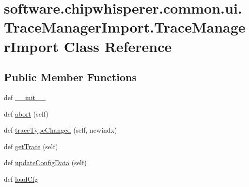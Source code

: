 \hypertarget{classsoftware_1_1chipwhisperer_1_1common_1_1ui_1_1TraceManagerImport_1_1TraceManagerImport}{}\section{software.\+chipwhisperer.\+common.\+ui.\+Trace\+Manager\+Import.\+Trace\+Manager\+Import Class Reference}
\label{classsoftware_1_1chipwhisperer_1_1common_1_1ui_1_1TraceManagerImport_1_1TraceManagerImport}
\subsection*{Public Member Functions}
\begin{DoxyCompactItemize}
\item 
def \hyperlink{classsoftware_1_1chipwhisperer_1_1common_1_1ui_1_1TraceManagerImport_1_1TraceManagerImport_acc5e04d4028fce434a2506f22c4ce721}{\+\_\+\+\_\+init\+\_\+\+\_\+}
\item 
def \hyperlink{classsoftware_1_1chipwhisperer_1_1common_1_1ui_1_1TraceManagerImport_1_1TraceManagerImport_a796755e6a563073c29e6fe7494162a86}{abort} (self)
\item 
def \hyperlink{classsoftware_1_1chipwhisperer_1_1common_1_1ui_1_1TraceManagerImport_1_1TraceManagerImport_ae0f243a405fc65cf1a7da2db3921c32d}{trace\+Type\+Changed} (self, newindx)
\item 
def \hyperlink{classsoftware_1_1chipwhisperer_1_1common_1_1ui_1_1TraceManagerImport_1_1TraceManagerImport_acaa73cc400bad59dd008b50d903d52ea}{get\+Trace} (self)
\item 
def \hyperlink{classsoftware_1_1chipwhisperer_1_1common_1_1ui_1_1TraceManagerImport_1_1TraceManagerImport_a4d25ecf9d164ef13a994c177e1532fee}{update\+Config\+Data} (self)
\item 
def \hyperlink{classsoftware_1_1chipwhisperer_1_1common_1_1ui_1_1TraceManagerImport_1_1TraceManagerImport_a835e9ecb65caa0ae2455679fd9d54f02}{load\+Cfg}
\end{DoxyCompactItemize}
